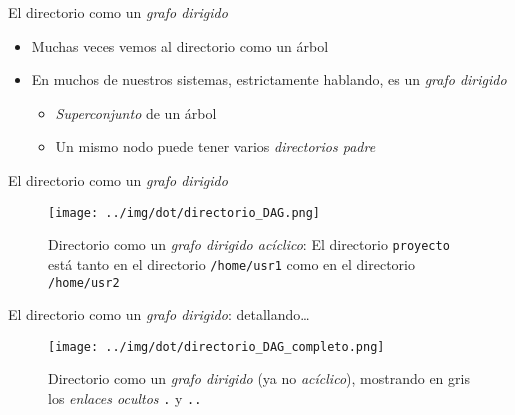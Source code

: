 \documentclass[presentation]{beamer}
\begin{document}
\begin{frame}[label={sec:org905ac73}]{El directorio como un \emph{grafo dirigido}}
\begin{itemize}
\item Muchas veces vemos al directorio como un árbol
\item En muchos de nuestros sistemas, estrictamente hablando, es un
\emph{grafo dirigido}
\begin{itemize}
\item \emph{Superconjunto} de un árbol
\item Un mismo nodo puede tener varios \emph{directorios padre}
\end{itemize}
\end{itemize}
\end{frame}

\begin{frame}[label={sec:org9f7a9d9}]{El directorio como un \emph{grafo dirigido}}
\begin{figure}[htbp]
\centering
\texttt{[image: ../img/dot/directorio\_DAG.png]}
\caption{Directorio como un \emph{grafo dirigido acíclico}: El directorio \texttt{proyecto} está tanto en el directorio \texttt{/home/usr1} como en el directorio \texttt{/home/usr2}}
\end{figure}
\end{frame}

\begin{frame}[label={sec:org792e589}]{El directorio como un \emph{grafo dirigido}: detallando\ldots{}}
\begin{figure}[htbp]
\centering
\texttt{[image: ../img/dot/directorio\_DAG\_completo.png]}
\caption{Directorio como un \emph{grafo dirigido} (ya no \emph{acíclico}), mostrando en gris los \emph{enlaces ocultos} \texttt{.} y \texttt{..}}
\end{figure}
\end{frame}
\end{document}
